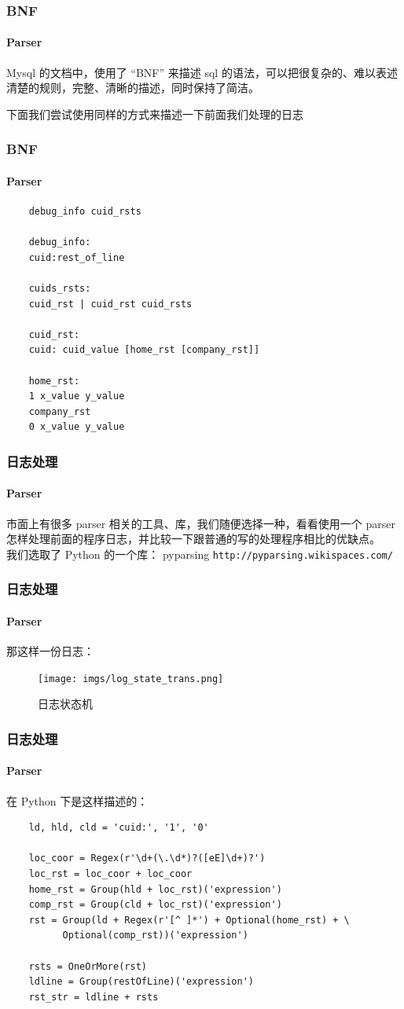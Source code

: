 \begin{frame}[fragile]
  \frametitle{BNF}
  \framesubtitle{Parser}

  Mysql 的文档中，使用了 “BNF” 来描述 sql 的语法，可以把很复杂的、难以表述清楚的规则，完整、清晰的描述，同时保持了简洁。

  \vspace{\baselineskip}

  下面我们尝试使用同样的方式来描述一下前面我们处理的日志
  
\end{frame}

\begin{frame}[fragile]
  \frametitle{BNF}
  \framesubtitle{Parser}
  \begin{verbatim}
    debug_info cuid_rsts

    debug_info:
    cuid:rest_of_line

    cuids_rsts:
    cuid_rst | cuid_rst cuid_rsts
    
    cuid_rst:
    cuid: cuid_value [home_rst [company_rst]]
    
    home_rst:
    1 x_value y_value
    company_rst
    0 x_value y_value
  \end{verbatim}
\end{frame}

\begin{frame}[fragile]
  \frametitle{日志处理}
  \framesubtitle{Parser}
  市面上有很多 parser 相关的工具、库，我们随便选择一种，看看使用一个 parser 怎样处理前面的程序日志，并比较一下跟普通的写的处理程序相比的优缺点。   \\
  \pause
  \vspace{\baselineskip}
  我们选取了 Python 的一个库： pyparsing
  \verb|http://pyparsing.wikispaces.com/|
\end{frame}

\begin{frame}[fragile]
  \frametitle{日志处理}
  \framesubtitle{Parser}
  那这样一份日志：
  \begin{figure}[htbp]
    \centering
    \texttt{[image: imgs/log\_state\_trans.png]}
    \caption{日志状态机}
    \label{fig:loc-trans}
  \end{figure}
\end{frame}

\begin{frame}[fragile]
  \frametitle{日志处理}
  \framesubtitle{Parser}
  在 Python 下是这样描述的：
  \begin{verbatim}
    ld, hld, cld = 'cuid:', '1', '0'

    loc_coor = Regex(r'\d+(\.\d*)?([eE]\d+)?')
    loc_rst = loc_coor + loc_coor
    home_rst = Group(hld + loc_rst)('expression')
    comp_rst = Group(cld + loc_rst)('expression')
    rst = Group(ld + Regex(r'[^ ]*') + Optional(home_rst) + \
          Optional(comp_rst))('expression')
    
    rsts = OneOrMore(rst)
    ldline = Group(restOfLine)('expression')
    rst_str = ldline + rsts
  \end{verbatim}
  
\end{frame}


